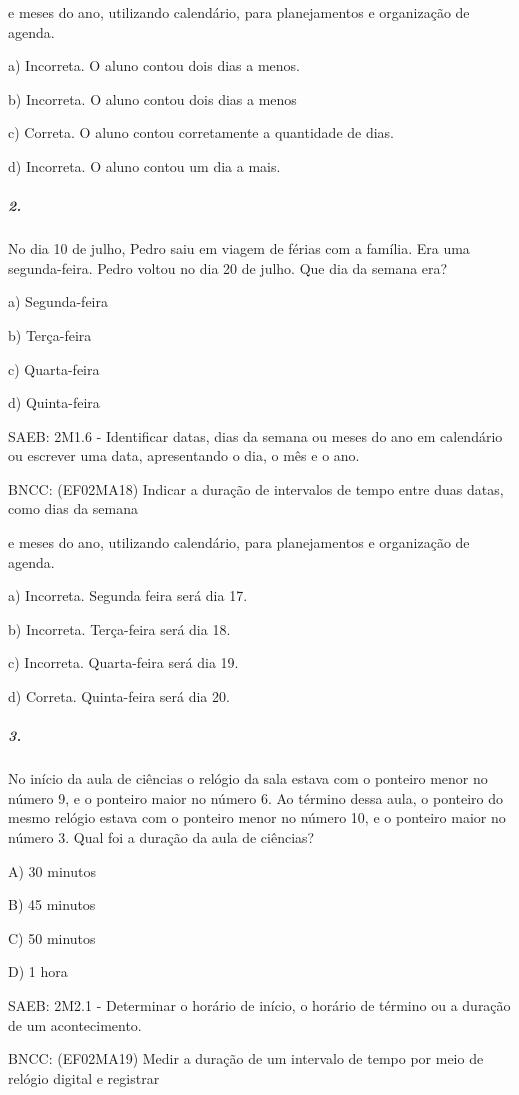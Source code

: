 e meses do ano, utilizando calendário, para planejamentos e organização
de agenda.

a) Incorreta. O aluno contou dois dias a menos.

b) Incorreta. O aluno contou dois dias a menos

c) Correta. O aluno contou corretamente a quantidade de dias.

d) Incorreta. O aluno contou um dia a mais.

\subparagraph{2.}\label{section-55}

No dia 10 de julho, Pedro saiu em viagem de férias com a família. Era
uma segunda-feira. Pedro voltou no dia 20 de julho. Que dia da semana
era?

a) Segunda-feira

b) Terça-feira

c) Quarta-feira

d) Quinta-feira

SAEB: 2M1.6 - Identificar datas, dias da semana ou meses do ano em
calendário ou escrever uma data, apresentando o dia, o mês e o ano.

BNCC: (EF02MA18) Indicar a duração de intervalos de tempo entre duas
datas, como dias da semana

e meses do ano, utilizando calendário, para planejamentos e organização
de agenda.

a) Incorreta. Segunda feira será dia 17.

b) Incorreta. Terça-feira será dia 18.

c) Incorreta. Quarta-feira será dia 19.

d) Correta. Quinta-feira será dia 20.

\subparagraph{3.}\label{section-56}

No início da aula de ciências o relógio da sala estava com o ponteiro
menor no número 9, e o ponteiro maior no número 6. Ao término dessa
aula, o ponteiro do mesmo relógio estava com o ponteiro menor no número
10, e o ponteiro maior no número 3. Qual foi a duração da aula de
ciências?

A) 30 minutos

B) 45 minutos

C) 50 minutos

D) 1 hora

SAEB: 2M2.1 - Determinar o horário de início, o horário de término ou a
duração de um acontecimento.

BNCC: (EF02MA19) Medir a duração de um intervalo de tempo por meio de
relógio digital e registrar


